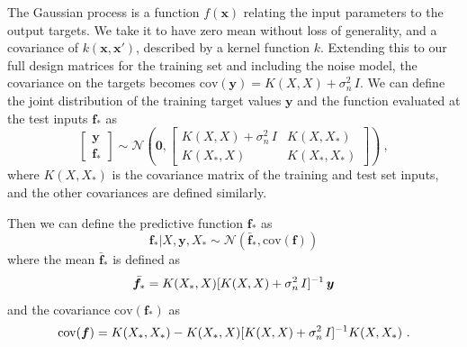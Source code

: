 The Gaussian process is a function $f(\bm{x})$ relating the input parameters to the output targets.
We take it to have zero mean without loss of generality, and a covariance of $k(\bm{x}, \bm{x'})$, described by a kernel function $k$. 
Extending this to our full design matrices for the training set and including the noise model, the covariance on the targets becomes $\mathrm{cov}(\bm{y}) = K(X,X) + \sigma_n^2\,I$.
We can define the joint distribution of the training target values $\bm{y}$ and the function evaluated at the test inputs $\bm{f}_*$ as
\begin{equation}
    \begin{bmatrix}
    \bm{y}\\
    \bm{f}_*
    \end{bmatrix}
    \sim \mathcal{N}\left( \bm{0}, 
    \begin{bmatrix}
    K(X,X) + \sigma_n^2\,I & K(X,X_*)\\
    K(X_*,X) & K(X_*,X_*)
    \end{bmatrix}
    \right) ~,
\end{equation}
where $K(X,X_*)$ is the covariance matrix of the training and test set inputs, and the other covariances are defined similarly.

Then we can define the predictive function $\bm{f}_*$  as
\begin{equation}
\label{eq:gp_pred}
    \bm{f}_* | X, \bm{y}, X_* \sim \mathcal{N}\left( \bar{\bm{f}}_*, \mathrm{cov}(\bm{f}) \right)
\end{equation}
where the mean $\bar{\bm{f}}_*$ is defined as
\begin{equation}
    \bar{\bm{f}}_* = K(X_*, X) [K(X,X) + \sigma_n^2\,I]^{-1} \, \bm{y} 
\end{equation}
and the covariance  $\mathrm{cov}(\bm{f}_*)$ as
\begin{equation}
    \mathrm{cov}(\bm{f}) = K(X_*, X_*) - K(X_*, X)[K(X,X) + \sigma_n^2\,I]^{-1} K(X,X_*) ~.
\end{equation}

